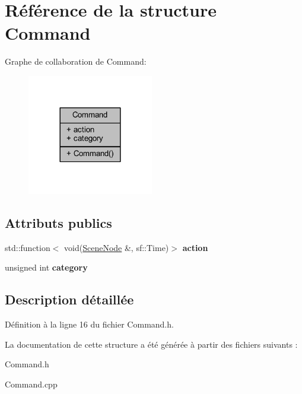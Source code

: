 \hypertarget{struct_command}{}\section{Référence de la structure Command}
\label{struct_command}


Graphe de collaboration de Command\+:\nopagebreak
\begin{figure}[H]
\begin{center}
\leavevmode
\includegraphics[width=156pt]{struct_command__coll__graph}
\end{center}
\end{figure}
\subsection*{Attributs publics}
\begin{DoxyCompactItemize}
\item 
\hypertarget{struct_command_a104fe6a9eb7bc8fc2f23acc67eb2b1d9}{}\label{struct_command_a104fe6a9eb7bc8fc2f23acc67eb2b1d9} 
std\+::function$<$ void(\hyperlink{class_scene_node}{Scene\+Node} \&, sf\+::\+Time)$>$ {\bfseries action}
\item 
\hypertarget{struct_command_a1529e898c9e6dd47b1826b5b1eac09fb}{}\label{struct_command_a1529e898c9e6dd47b1826b5b1eac09fb} 
unsigned int {\bfseries category}
\end{DoxyCompactItemize}


\subsection{Description détaillée}


Définition à la ligne 16 du fichier Command.\+h.



La documentation de cette structure a été générée à partir des fichiers suivants \+:\begin{DoxyCompactItemize}
\item 
Command.\+h\item 
Command.\+cpp\end{DoxyCompactItemize}
